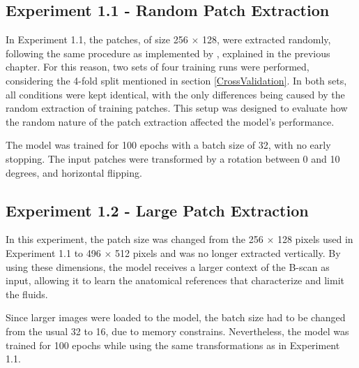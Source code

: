 \subsection{Experiment 1.1 - Random Patch Extraction}
In Experiment 1.1, the patches, of size 256 $\times$ 128, were extracted randomly, following the same procedure as implemented by \textcite{Tennakoon2018}, explained in the previous chapter. For this reason, two sets of four training runs were performed, considering the 4-fold split mentioned in section \ref{CrossValidation}. In both sets, all conditions were kept identical, with the only differences being caused by the random extraction of training patches. This setup was designed to evaluate how the random nature of the patch extraction affected the model's performance. 
\par
The model was trained for 100 epochs with a batch size of 32, with no early stopping. The input patches were transformed by a rotation between 0 and 10 degrees, and horizontal flipping. 

\subsection{Experiment 1.2 - Large Patch Extraction}
In this experiment, the patch size was changed from the 256 $\times$ 128 pixels used in Experiment 1.1 to 496 $\times$ 512 pixels and was no longer extracted vertically. By using these dimensions, the model receives a larger context of the B-scan as input, allowing it to learn the anatomical references that characterize and limit the fluids.
\par
Since larger images were loaded to the model, the batch size had to be changed from the usual 32 to 16, due to memory constrains. Nevertheless, the model was trained for 100 epochs while using the same transformations as in Experiment 1.1.

